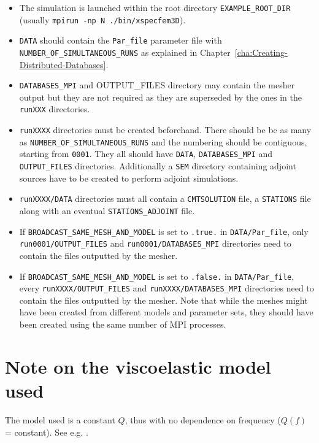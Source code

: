 \begin{itemize}
\item The simulation is launched within the root directory \texttt{EXAMPLE\_ROOT\_DIR}\newline
(usually \texttt{mpirun -np N ./bin/xspecfem3D}).
\item \texttt{DATA} should contain the \texttt{Par\_file} parameter file with
\texttt{NUMBER\_OF\_SIMULTANEOUS\_RUNS} as explained in Chapter~\ref{cha:Creating-Distributed-Databases}.
\item \texttt{DATABASES\_MPI} and {OUTPUT\_FILES} directory may contain the mesher output but they
are not required as they are superseded by the ones in the \texttt{runXXX} directories.
\item \texttt{runXXXX} directories must be created beforehand. There should be be as many as
\texttt{NUMBER\_OF\_SIMULTANEOUS\_RUNS} and the numbering should be contiguous, starting from \texttt{0001}.
They all should have \texttt{DATA},
\texttt{DATABASES\_MPI} and \texttt{OUTPUT\_FILES} directories. Additionally a \texttt{SEM} directory
containing adjoint sources have to be created to perform adjoint simulations.
\item \texttt{runXXXX/DATA} directories must all contain a \texttt{CMTSOLUTION} file,
a \texttt{STATIONS} file along with an eventual \texttt{STATIONS\_ADJOINT} file.
\item If \texttt{BROADCAST\_SAME\_MESH\_AND\_MODEL} is set to \texttt{.true.} in \texttt{DATA/Par\_file},
only \texttt{run0001/OUTPUT\_FILES} and \texttt{run0001/DATABASES\_MPI} directories need to contain the files
outputted by the mesher.
\item If \texttt{BROADCAST\_SAME\_MESH\_AND\_MODEL} is set to \texttt{.false.} in \texttt{DATA/Par\_file},
every \texttt{runXXXX/OUTPUT\_FILES} and \texttt{runXXXX/DATABASES\_MPI} directories need to contain the files
outputted by the mesher. Note that while the meshes might have been created from different models and
parameter sets, they should have been created using the same number of MPI processes.
\end{itemize}


\section{Note on the viscoelastic model used}

\noindent
The model used is a constant $Q$, thus with no dependence on frequency ($Q(f)$ = constant).
See e.g. \cite{BlKoChLoXi16}. \newline

